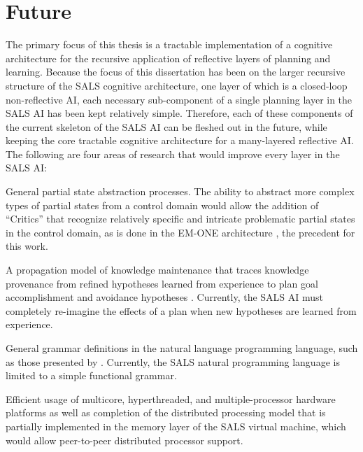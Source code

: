 \chapter{Future}\label{chapter:future}

The primary focus of this thesis is a tractable implementation of a
cognitive architecture for the recursive application of reflective
layers of planning and learning.  Because the focus of this
dissertation has been on the larger recursive structure of the SALS
cognitive architecture, one layer of which is a closed-loop
non-reflective AI, each necessary sub-component of a single planning
layer in the SALS AI has been kept relatively simple.  Therefore, each
of these components of the current skeleton of the SALS AI can be
fleshed out in the future, while keeping the core tractable cognitive
architecture for a many-layered reflective AI.  The following are four
areas of research that would improve every layer in the SALS AI:
\begin{packed_enumerate}
\item{General partial state abstraction processes.  The ability to
  abstract more complex types of partial states from a control domain
  would allow the addition of ``Critics'' that recognize relatively
  specific and intricate problematic partial states in the control
  domain, as is done in the EM-ONE architecture \cite[]{singh:2005b},
  the precedent for this work.}
\item{A propagation model of knowledge maintenance that traces
  knowledge provenance from refined hypotheses learned from experience
  to plan goal accomplishment and avoidance hypotheses
  \cite[]{radul:2009}.  Currently, the SALS AI must completely
  re-imagine the effects of a plan when new hypotheses are learned
  from experience.}
\item{General grammar definitions in the natural language programming
  language, such as those presented by \cite{winograd:1970}.
  Currently, the SALS natural programming language is limited to a
  simple functional grammar.}
\item{Efficient usage of multicore, hyperthreaded, and
  multiple-processor hardware platforms as well as completion of the
  distributed processing model that is partially implemented in the
  memory layer of the SALS virtual machine, which would allow
  peer-to-peer distributed processor support.}
\end{packed_enumerate}
